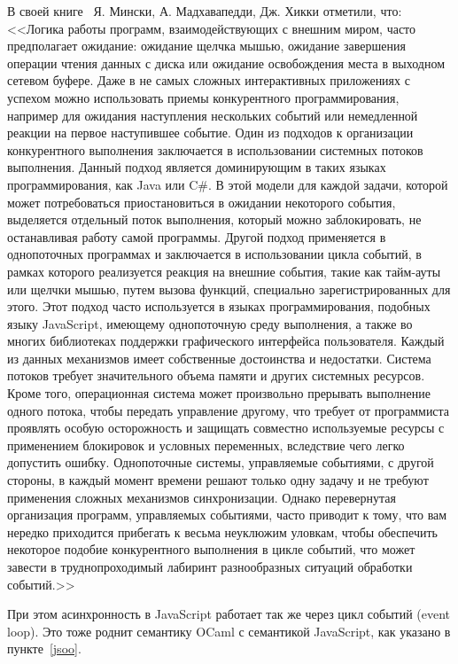 В своей книге~\cite{rwo-ru} Я. Мински, А. Мадхавапедди, Дж. Хикки отметили, что:
<<Логика работы программ, взаимодействующих с внешним миром, часто предполагает
ожидание: ожидание щелчка мышью, ожидание завершения операции чтения
данных с диска или ожидание освобождения места в выходном сетевом буфере.
Даже в не самых сложных интерактивных приложениях с успехом можно использовать
приемы конкурентного программирования, например для ожидания наступления
нескольких событий или немедленной реакции на первое наступившее событие.
Один из подходов к организации конкурентного выполнения заключается
в использовании системных потоков выполнения. Данный подход является
доминирующим в таких языках программирования, как Java или C\#. В этой модели
для каждой задачи, которой может потребоваться приостановиться в ожидании
некоторого события, выделяется отдельный поток выполнения, который можно
заблокировать, не останавливая работу самой программы.
Другой подход применяется в однопоточных программах и заключается в
использовании цикла событий, в рамках которого реализуется реакция на внешние
события, такие как тайм-ауты или щелчки мышью, путем вызова функций,
специально зарегистрированных для этого. Этот подход часто используется в языках
программирования, подобных языку JavaScript, имеющему однопоточную среду
выполнения, а также во многих библиотеках поддержки графического
интерфейса пользователя.
Каждый из данных механизмов имеет собственные достоинства и недостатки.
Система потоков требует значительного объема памяти и других системных
ресурсов. Кроме того, операционная система может произвольно прерывать
выполнение одного потока, чтобы передать управление другому, что требует
от программиста проявлять особую осторожность и защищать совместно используемые
ресурсы с применением блокировок и условных переменных, вследствие чего
легко допустить ошибку.
Однопоточные системы, управляемые событиями, с другой стороны, в каждый
момент времени решают только одну задачу и не требуют применения сложных
механизмов синхронизации. Однако перевернутая организация программ,
управляемых событиями, часто приводит к тому, что вам нередко приходится прибегать
к весьма неуклюжим уловкам, чтобы обеспечить некоторое подобие
конкурентного выполнения в цикле событий, что может завести в труднопроходимый
лабиринт разнообразных ситуаций обработки событий.>>

При этом асинхронность в JavaScript работает так же через цикл событий (event loop).
Это тоже роднит семантику OCaml с семантикой JavaScript, как указано в пункте~\ref{jsoo}.

